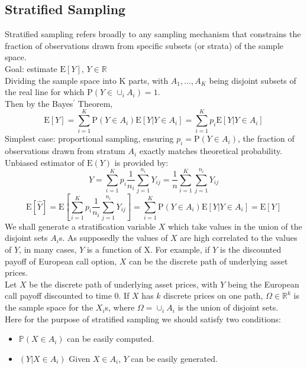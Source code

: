 \subsection{Stratified Sampling}
Stratified sampling refers broadly to any sampling mechanism that constrains
the fraction of observations drawn from specific subsets (or strata) of the
sample space. \\
Goal: estimate $\mathrm{E}[Y]$, $Y \in \mathbb{R}$\\
Dividing the sample space into K parts, with $A_{1}, \dots ,A_{K}$ being disjoint subsets of the real line for which $\mathrm{P}(Y \in \cup_{i}A_{i}) = 1$. \\
Then by the Bayes$^{\prime}$ Theorem,
$$ \mathrm{E}[Y] = \sum_{i=1}^{K}\mathrm{P}(Y \in A_{i})\mathrm{E}[Y|Y \in A_{i}] = \sum_{i=1}^{K}p_{i}\mathrm{E}[Y|Y \in A_{i}] $$
Simplest case: proportional sampling, ensuring $p_{i} = \mathrm{P}(Y \in A_{i})$, the fraction of observations drawn from stratum $A_{i}$ exactly matches theoretical probability.\\
Unbiased estimator of $\mathrm{E}(Y)$ is provided by:\\
$$\hat{Y} = \sum_{i=1}^{K} p_{i} \frac{1}{n_{i}} \sum_{j=1}^{n_{i}} Y_{ij} = \frac{1}{n} \sum_{i=1}^{K} \sum_{j=1}^{n_{i}} Y_{ij}$$
$$ \mathrm{E}[\hat{Y}] = \mathrm{E}[\sum_{i=1}^{K} p_{i} \frac{1}{n_{i}} \sum_{j=1}^{n_{i}} Y_{ij}] = \sum_{i=1}^{K}\mathrm{P}(Y \in A_{i})\mathrm{E}[Y|Y \in A_{i}] = \mathrm{E}[Y]$$
We shall generate a stratification variable $X$ which take values in the union of the disjoint sets $A_{i}$s. As supposedly the values of $X$ are high correlated to the values of $Y$, in many cases, $Y$ is a function of X. For example, if $Y$ is the discounted payoff of European call option, $X$ can be the discrete path of underlying asset prices.\\
Let $X$ be the discrete path of underlying asset prices, with $Y$ being the European call payoff discounted to time 0. If $X$ has $k$ discrete prices on one path, $\Omega \in \mathbb{R}^{k}$ is the sample space for the $X_{i}$s, where $\Omega = \cup_{i} A_{i}$ is the union of disjoint sets.\\
Here for the purpose of stratified sampling we should satisfy two conditions:
\begin{itemize}
	\item $\mathbb{P}(X \in A_{i})$ can be easily computed.
	\item $(Y | X \in A_{i})$ Given $X \in A_{i}$, $Y$ can be easily generated.
\end{itemize}
